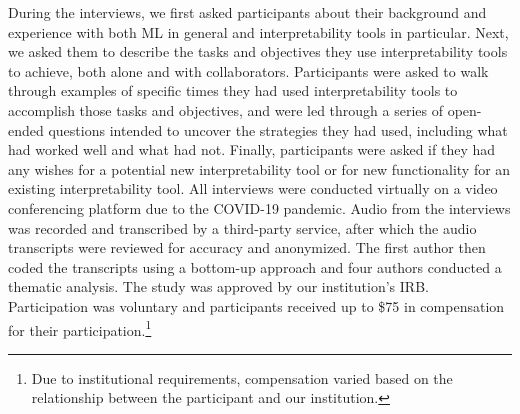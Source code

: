 \documentclass[11pt,dvipdfmx]{article}
\begin{document}
During the interviews, we first asked participants about their
background and experience with both ML in general and interpretability
tools in particular. Next, we asked them to describe the
tasks and objectives they use interpretability tools to achieve, both
alone and with collaborators. Participants were asked to walk through
examples of specific times they had used interpretability tools to
accomplish those tasks and objectives, and were led through a series of
open-ended questions intended to uncover the strategies they had used,
including what had worked well and what had not.  Finally,
participants were asked if they had any wishes for a potential new
interpretability tool or for new functionality for an existing
interpretability tool. All interviews were conducted virtually on a
video conferencing platform due to the COVID-19 pandemic.  Audio from
the interviews was recorded and transcribed by a third-party service,
after which the audio transcripts were reviewed for accuracy and
anonymized. The first author then coded the transcripts using a
bottom-up approach and four authors conducted a thematic analysis. The
study was approved by our institution's IRB. Participation was
voluntary and participants received up to \$75 in compensation for
their participation.\footnote{Due to institutional requirements,
  compensation varied based on the relationship between the
  participant and our institution.}
\end{document}
